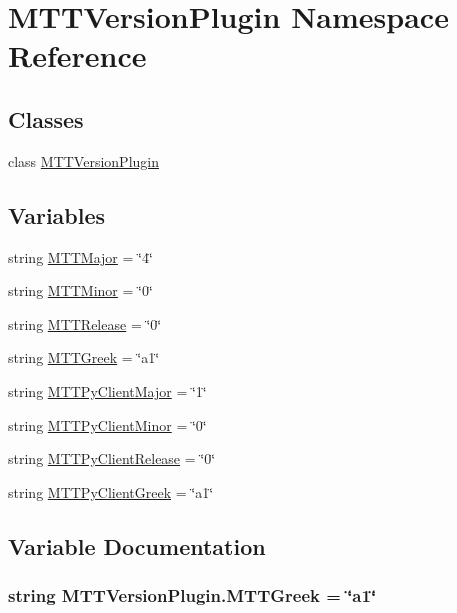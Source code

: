 \hypertarget{namespaceMTTVersionPlugin}{\section{M\-T\-T\-Version\-Plugin Namespace Reference}
\label{namespaceMTTVersionPlugin}
}
\subsection*{Classes}
\begin{DoxyCompactItemize}
\item 
class \hyperlink{classMTTVersionPlugin_1_1MTTVersionPlugin}{M\-T\-T\-Version\-Plugin}
\end{DoxyCompactItemize}
\subsection*{Variables}
\begin{DoxyCompactItemize}
\item 
string \hyperlink{namespaceMTTVersionPlugin_af9e75ea5f854bed820d4cb64fa455124}{M\-T\-T\-Major} = \char`\"{}4\char`\"{}
\item 
string \hyperlink{namespaceMTTVersionPlugin_ad80f82936d1bc7547278d4ce2ea3a275}{M\-T\-T\-Minor} = \char`\"{}0\char`\"{}
\item 
string \hyperlink{namespaceMTTVersionPlugin_a9d8e0707641b9a16174563aacdc82407}{M\-T\-T\-Release} = \char`\"{}0\char`\"{}
\item 
string \hyperlink{namespaceMTTVersionPlugin_ac27a9d2aec2e835e6f4dc27c68382f38}{M\-T\-T\-Greek} = \char`\"{}a1\char`\"{}
\item 
string \hyperlink{namespaceMTTVersionPlugin_a51adbd87756e59f2189831112aad767e}{M\-T\-T\-Py\-Client\-Major} = \char`\"{}1\char`\"{}
\item 
string \hyperlink{namespaceMTTVersionPlugin_aa431ead037b1e7329d119bc1e4017ced}{M\-T\-T\-Py\-Client\-Minor} = \char`\"{}0\char`\"{}
\item 
string \hyperlink{namespaceMTTVersionPlugin_ae6cedc84f8ae714487299ccdc4403a10}{M\-T\-T\-Py\-Client\-Release} = \char`\"{}0\char`\"{}
\item 
string \hyperlink{namespaceMTTVersionPlugin_a6df21a21318661784dcabdb81450ff48}{M\-T\-T\-Py\-Client\-Greek} = \char`\"{}a1\char`\"{}
\end{DoxyCompactItemize}


\subsection{Variable Documentation}
\hypertarget{namespaceMTTVersionPlugin_ac27a9d2aec2e835e6f4dc27c68382f38}{
\subsubsection[{M\-T\-T\-Greek}]{\setlength{\rightskip}{0pt plus 5cm}string M\-T\-T\-Version\-Plugin.\-M\-T\-T\-Greek = \char`\"{}a1\char`\"{}}}\label{namespaceMTTVersionPlugin_ac27a9d2aec2e835e6f4dc27c68382f38}


